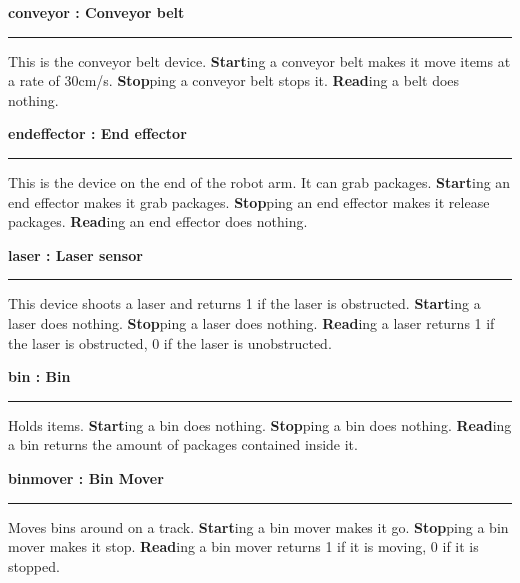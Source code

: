 \Huge\bfseries conveyor : \large Conveyor belt\par
\noindent\rule{ \textwidth }{2pt}\par
\vspace{ 0.5cm }
\mdseries\normalsize This is the conveyor belt device. \textbf{Start}ing a conveyor belt makes it move items at a rate of 30cm/s. \textbf{Stop}ping a conveyor belt stops it. \textbf{Read}ing a belt does nothing.

\pagebreak

\Huge\bfseries endeffector : \large End effector\par
\noindent\rule{ \textwidth }{2pt}\par
\vspace{ 0.5cm }
\mdseries\normalsize This is the device on the end of the robot arm. It can grab packages. \textbf{Start}ing an end effector makes it grab packages. \textbf{Stop}ping an end effector makes it release packages. \textbf{Read}ing an end effector does nothing.

\pagebreak

\Huge\bfseries laser : \large Laser sensor\par
\noindent\rule{ \textwidth }{2pt}\par
\vspace{ 0.5cm }
\mdseries\normalsize This device shoots a laser and returns 1 if the laser is obstructed. \textbf{Start}ing a laser does nothing. \textbf{Stop}ping a laser does nothing. \textbf{Read}ing a laser returns 1 if the laser is obstructed, 0 if the laser is unobstructed.

\pagebreak

\Huge\bfseries bin : \large Bin\par
\noindent\rule{ \textwidth }{2pt}\par
\vspace{ 0.5cm }
\mdseries\normalsize Holds items. \textbf{Start}ing a bin does nothing. \textbf{Stop}ping a bin does nothing. \textbf{Read}ing a bin returns the amount of packages contained inside it.

\pagebreak

\Huge\bfseries binmover : \large Bin Mover\par
\noindent\rule{ \textwidth }{2pt}\par
\vspace{ 0.5cm }
\mdseries\normalsize Moves bins around on a track. \textbf{Start}ing a bin mover makes it go. \textbf{Stop}ping a bin mover makes it stop. \textbf{Read}ing a bin mover returns 1 if it is moving, 0 if it is stopped.

\pagebreak